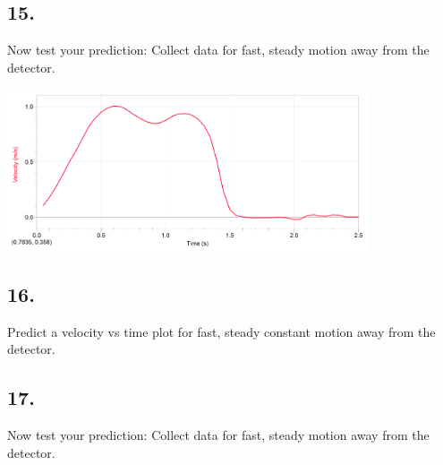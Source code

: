     \subsection*{15.}
    Now test your prediction: Collect data for fast, steady motion away from the detector.

    \begin{mdframed}
        \centering\includegraphics[width=0.8\textwidth]{image12.png}
    \end{mdframed}

    \subsection*{16.}
    Predict a velocity vs time plot for fast, steady constant motion away from the detector. 

    \begin{mdframed}
        \centering
    \end{mdframed}

    \subsection*{17.}
    Now test your prediction: Collect data for fast, steady motion away from the detector.


